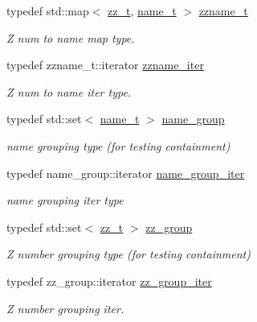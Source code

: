 \begin{DoxyCompactItemize}
typedef std\+::map$<$ \hyperlink{namespacepyne_1_1nucname_afc72282eda03d12bd117fe7a9c956880}{zz\+\_\+t}, \hyperlink{namespacepyne_1_1nucname_aed6b656cde69b79b33f6af37fabb2054}{name\+\_\+t} $>$ \hyperlink{namespacepyne_1_1nucname_ada82b59dc2e7bf529842a0951cbe0e68}{zzname\+\_\+t}
\begin{DoxyCompactList}\small\item\em Z num to name map type. \end{DoxyCompactList}\item 
\mbox{\label{namespacepyne_1_1nucname_a4fabf3e659aef06d90bb7eab271ed255}} 
typedef zzname\+\_\+t\+::iterator \hyperlink{namespacepyne_1_1nucname_a4fabf3e659aef06d90bb7eab271ed255}{zzname\+\_\+iter}
\begin{DoxyCompactList}\small\item\em Z num to name iter type. \end{DoxyCompactList}\item 
\mbox{\label{namespacepyne_1_1nucname_a8959cfbd85b0ccc8b51ca14e98de9791}} 
typedef std\+::set$<$ \hyperlink{namespacepyne_1_1nucname_aed6b656cde69b79b33f6af37fabb2054}{name\+\_\+t} $>$ \hyperlink{namespacepyne_1_1nucname_a8959cfbd85b0ccc8b51ca14e98de9791}{name\+\_\+group}
\begin{DoxyCompactList}\small\item\em name grouping type (for testing containment) \end{DoxyCompactList}\item 
\mbox{\label{namespacepyne_1_1nucname_a8688af33bcbdb1e381461c3140180376}} 
typedef name\+\_\+group\+::iterator \hyperlink{namespacepyne_1_1nucname_a8688af33bcbdb1e381461c3140180376}{name\+\_\+group\+\_\+iter}
\begin{DoxyCompactList}\small\item\em name grouping iter type \end{DoxyCompactList}\item 
\mbox{\label{namespacepyne_1_1nucname_a2e9463e61005389bbc50bfa210061582}} 
typedef std\+::set$<$ \hyperlink{namespacepyne_1_1nucname_afc72282eda03d12bd117fe7a9c956880}{zz\+\_\+t} $>$ \hyperlink{namespacepyne_1_1nucname_a2e9463e61005389bbc50bfa210061582}{zz\+\_\+group}
\begin{DoxyCompactList}\small\item\em Z number grouping type (for testing containment) \end{DoxyCompactList}\item 
\mbox{\label{namespacepyne_1_1nucname_aa1a31f11017397e7138249c26954d24c}} 
typedef zz\+\_\+group\+::iterator \hyperlink{namespacepyne_1_1nucname_aa1a31f11017397e7138249c26954d24c}{zz\+\_\+group\+\_\+iter}
\begin{DoxyCompactList}\small\item\em Z number grouping iter. \end{DoxyCompactList}\end{DoxyCompactItemize}
